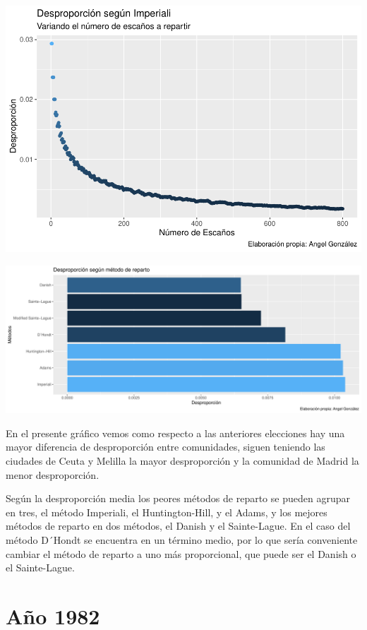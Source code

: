 \documentclass[12pt,a4paper,]{book}
\numberwithin{dummy}{section}
\theoremstyle{ocrenumbox}
\theoremstyle{blacknumex}
\theoremstyle{blacknumbox}
\theoremstyle{ocrenum}
\theoremstyle{ocrenum}
\begin{document}
\begin{center}\includegraphics[width=0.95\linewidth]{figurasR/unnamed-chunk-21-1} \end{center}

\begin{center}\includegraphics[width=0.95\linewidth]{figurasR/unnamed-chunk-21-2} \end{center}

En el presente gráfico vemos como respecto a las anteriores elecciones
hay una mayor diferencia de desproporción entre comunidades, siguen
teniendo las ciudades de Ceuta y Melilla la mayor desproporción y la
comunidad de Madrid la menor desproporción.

Según la desproporción media los peores métodos de reparto se pueden
agrupar en tres, el método Imperiali, el Huntington-Hill, y el Adams, y
los mejores métodos de reparto en dos métodos, el Danish y el
Sainte-Lague. En el caso del método D´Hondt se encuentra en un término
medio, por lo que sería conveniente cambiar el método de reparto a uno
más proporcional, que puede ser el Danish o el Sainte-Lague.

\hypertarget{auxf1o-1982}{%
\section{Año 1982}\label{auxf1o-1982}}
\end{document}
